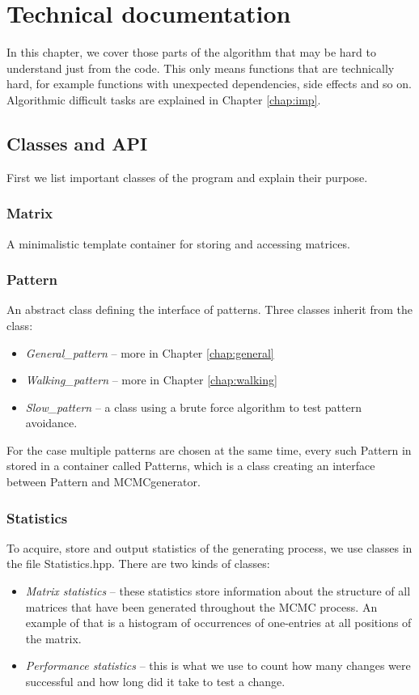 \chapter{Technical documentation}
\label{chap:tdoc}
In this chapter, we cover those parts of the algorithm that may be hard to understand just from the code. This only means functions that are technically hard, for example functions with unexpected dependencies, side effects and so on. Algorithmic difficult tasks are explained in Chapter \ref{chap:imp}.

\section{Classes and API}
First we list important classes of the program and explain their purpose.

\subsection{Matrix}
A minimalistic template container for storing and accessing matrices.

\subsection{Pattern}
An abstract class defining the interface of patterns. Three classes inherit from the class:
\begin{itemize}
\item \emph{General\_pattern} -- more in Chapter \ref{chap:general}
\item \emph{Walking\_pattern} -- more in Chapter \ref{chap:walking}
\item \emph{Slow\_pattern} -- a class using a brute force algorithm to test pattern avoidance.
\end{itemize}

For the case multiple patterns are chosen at the same time, every such Pattern in stored in a container called Patterns, which is a class creating an interface between Pattern and MCMCgenerator.

\subsection{Statistics}
To acquire, store and output statistics of the generating process, we use classes in the file Statistics.hpp. There are two kinds of classes:
\begin{itemize}
\item \emph{Matrix statistics} -- these statistics store information about the structure of all matrices that have been generated throughout the MCMC process. An example of that is a histogram of occurrences of one-entries at all positions of the matrix.
\item \emph{Performance statistics} -- this is what we use to count how many changes were successful and how long did it take to test a change.
\end{itemize}


